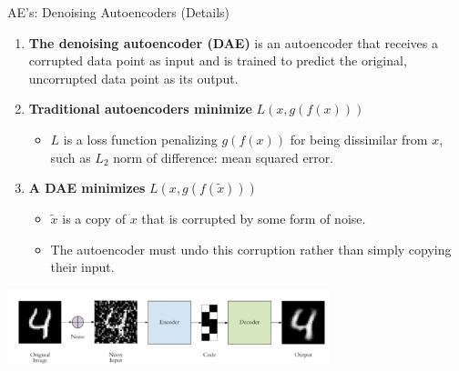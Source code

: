 \documentclass[serif, aspectratio=169]{beamer}
\begin{document}
\begin{frame}{AE’s: Denoising Autoencoders (Details)}
    \small
    \vspace{-0.2cm}

    \begin{enumerate}
        \item \textbf{The denoising autoencoder (DAE)} is an autoencoder that receives a corrupted data point as input and is trained to predict the original, uncorrupted data point as its output.
        
        \item \textbf{Traditional autoencoders minimize} {\color{blue} \( L(x, g(f(x))) \)}
        \begin{itemize}
            \item \small \( L \) is a loss function penalizing \( g(f(x)) \) for being dissimilar from \( x \), such as \( L_2 \) norm of difference: mean squared error.
        \end{itemize}

        \item \textbf{A DAE minimizes} {\color{blue} \( L(x, g(f(\tilde{x}))) \)}
        \begin{itemize}
            \item \small \( \tilde{x} \) is a copy of \( x \) that is corrupted by some form of noise.
            \item \small The autoencoder must undo this corruption rather than simply copying their input.
        \end{itemize}
    \end{enumerate}
    
    \vspace{0.3cm}
    \begin{center}
        \includegraphics[width=0.7\textwidth]{pic/DAE details1.png}
    \end{center}
\end{frame}
\end{document}
